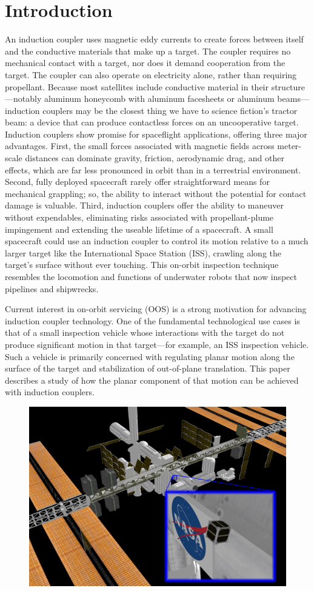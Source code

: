\section{Introduction} 
An induction coupler uses magnetic eddy currents to create forces between itself and the conductive materials that make up a target. The coupler requires no mechanical contact with a target, nor does it demand cooperation from the target. The coupler can also operate on electricity alone, rather than requiring propellant. Because most satellites include conductive material in their structure—notably aluminum honeycomb with aluminum facesheets or aluminum beams—induction couplers may be the closest thing we have to science fiction's tractor beam: a device that can produce  contactless forces on an uncooperative target. 
Induction couplers show promise for spaceflight applications, offering three major advantages. First, the small forces associated with magnetic fields across meter-scale distances can dominate gravity, friction, aerodynamic drag, and other effects, which are far less pronounced in orbit than in a terrestrial environment. Second, fully deployed spacecraft rarely offer straightforward means for mechanical grappling; so, the ability to interact without the potential for contact damage is valuable. Third, induction couplers offer the ability to maneuver without expendables, eliminating risks associated with propellant-plume impingement and extending the useable lifetime of a spacecraft.
A small spacecraft could use an induction coupler to control its motion relative to a much larger target like the International Space Station (ISS), crawling along the target’s surface without ever touching. This on-orbit inspection technique resembles the locomotion and functions of underwater robots that now inspect pipelines and shipwrecks. 
 
Current interest in on-orbit servicing (OOS) is a strong motivation for advancing induction coupler technology. One of the fundamental technological use cases is that of a small inspection vehicle whose interactions with the target do not produce significant motion in that target—for example, an ISS inspection vehicle. Such a vehicle is primarily concerned with regulating planar motion along the surface of the target and stabilization of out-of-plane translation. This paper  describes a study of how the planar component of that motion can be achieved with induction couplers. 

\begin{figure}
\includegraphics[scale=0.25]{figures/iss_inspector.jpg}
\label{fig:iss_inspector}
\end{figure}


